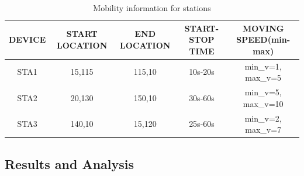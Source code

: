 \documentclass{article}
\begin{document}
    	\begin{table}[h]
       		\begin{tabular}{|c|c|c|c|c|}
        			\hline
        			DEVICE & START LOCATION & END LOCATION & START-STOP TIME & MOVING SPEED(min-max)  \\
        			\hline
        			STA1 & 15,115 & 115,10 & 10s-20s & min\_v=1, max\_v=5 \\
        			STA2 & 20,130 & 150,10 & 30s-60s & min\_v=5, max\_v=10 \\
        			STA3 & 140,10 & 15,120 & 25s-60s & min\_v=2, max\_v=7 \\
        			\hline
        		\end{tabular}
        \caption{Mobility information for stations}
        \label{tab:2}
    	\end{table}
\subsection{Results and Analysis}
\end{document}
